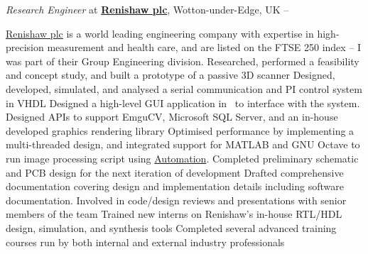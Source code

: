 \documentclass[a4paper,10pt,oneside]{article}
\begin{document}
\begin{body}

\BigEntryGapNoBreak
\textit{Research Engineer} at
\href{https://www.renishaw.com/}
{\textbf{Renishaw plc}},
Wotton-under-Edge, UK
\hfill
{} --
{}
\begin{detailwithoutsubheading}
\href{https://www.renishaw.com/}{Renishaw plc} is a world leading engineering company with expertise in high-precision measurement and health care, and are listed on the FTSE 250 index -- I was part of their Group Engineering division.
\BulletItem
Researched, performed a feasibility and concept study, and built a prototype of a passive 3D scanner
\BulletItem
Designed, developed, simulated, and analysed a serial communication and PI control system in VHDL 
\BulletItem
Designed a high-level GUI application in \Csharp \ to interface with the system. Designed APIs to support EmguCV, Microsoft SQL Server, and an in-house developed graphics rendering library
\BulletItem
Optimised performance by implementing a multi-threaded design, and integrated support for MATLAB and GNU Octave to run image processing script using \href{https://msdn.microsoft.com/en-us/library/windows/desktop/ms221375(v=vs.85).aspx}{Automation}. 
\BulletItem
Completed preliminary schematic and PCB design for the next iteration of development
\BulletItem
Drafted comprehensive documentation covering design and implementation details including software documentation. Involved in code/design reviews and presentations with senior members of the team
\BulletItem
Trained new interns on Renishaw's in-house RTL/HDL design, simulation, and synthesis tools
\BulletItem
Completed several advanced training courses run by both internal and external industry professionals

\end{detailwithoutsubheading}
\end{body}
\end{document}
